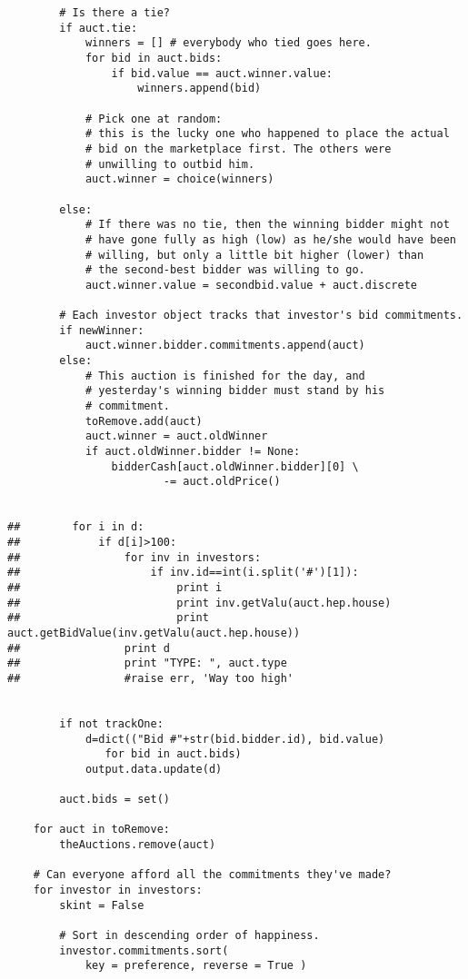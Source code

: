\begin{lstlisting}
        # Is there a tie?
        if auct.tie:
            winners = [] # everybody who tied goes here.
            for bid in auct.bids:
                if bid.value == auct.winner.value:
                    winners.append(bid)

            # Pick one at random:
            # this is the lucky one who happened to place the actual
            # bid on the marketplace first. The others were
            # unwilling to outbid him.
            auct.winner = choice(winners)
            
        else:
            # If there was no tie, then the winning bidder might not
            # have gone fully as high (low) as he/she would have been
            # willing, but only a little bit higher (lower) than
            # the second-best bidder was willing to go.
            auct.winner.value = secondbid.value + auct.discrete

        # Each investor object tracks that investor's bid commitments.
        if newWinner:
            auct.winner.bidder.commitments.append(auct)
        else:
            # This auction is finished for the day, and
            # yesterday's winning bidder must stand by his
            # commitment.
            toRemove.add(auct)
            auct.winner = auct.oldWinner
            if auct.oldWinner.bidder != None:
                bidderCash[auct.oldWinner.bidder][0] \
                        -= auct.oldPrice()

        
##        for i in d:
##            if d[i]>100:
##                for inv in investors:
##                    if inv.id==int(i.split('#')[1]):
##                        print i
##                        print inv.getValu(auct.hep.house)
##                        print auct.getBidValue(inv.getValu(auct.hep.house))
##                print d
##                print "TYPE: ", auct.type
##                #raise err, 'Way too high'

        
        if not trackOne:
            d=dict(("Bid #"+str(bid.bidder.id), bid.value)
               for bid in auct.bids)
            output.data.update(d)

        auct.bids = set()

    for auct in toRemove:
        theAuctions.remove(auct)
    
    # Can everyone afford all the commitments they've made?
    for investor in investors:
        skint = False

        # Sort in descending order of happiness.
        investor.commitments.sort(
            key = preference, reverse = True )


\end{lstlisting}
